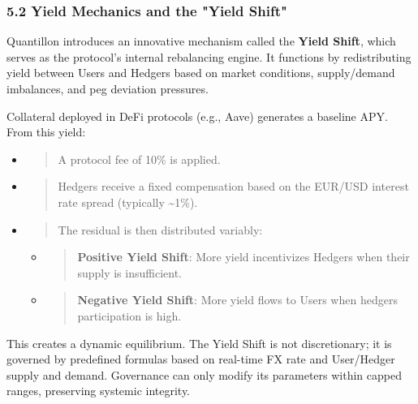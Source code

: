\hypertarget{section-3}{%
\paragraph{}\label{section-3}}

\hypertarget{yield-mechanics-and-the-yield-shift}{%
\subsubsection{5.2 Yield Mechanics and the "Yield
Shift"}\label{yield-mechanics-and-the-yield-shift}}

Quantillon introduces an innovative mechanism called the \textbf{Yield
Shift}, which serves as the protocol's internal rebalancing engine. It
functions by redistributing yield between Users and Hedgers based on
market conditions, supply/demand imbalances, and peg deviation
pressures.

Collateral deployed in DeFi protocols (e.g., Aave) generates a baseline
APY. From this yield:

\begin{itemize}
\item
  \begin{quote}
  A protocol fee of 10\% is applied.
  \end{quote}
\item
  \begin{quote}
  Hedgers receive a fixed compensation based on the EUR/USD interest
  rate spread (typically \textasciitilde1\%).
  \end{quote}
\item
  \begin{quote}
  The residual is then distributed variably:
  \end{quote}

  \begin{itemize}
  \item
    \begin{quote}
    \textbf{Positive Yield Shift}: More yield incentivizes Hedgers when
    their supply is insufficient.
    \end{quote}
  \item
    \begin{quote}
    \textbf{Negative Yield Shift}: More yield flows to Users when
    hedgers participation is high.
    \end{quote}
  \end{itemize}
\end{itemize}

This creates a dynamic equilibrium. The Yield Shift is not
discretionary; it is governed by predefined formulas based on real-time
FX rate and User/Hedger supply and demand. Governance can only modify
its parameters within capped ranges, preserving systemic integrity.

